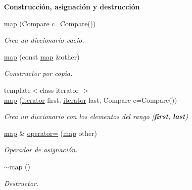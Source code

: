 \begin{Indent}\textbf{ Construcción, asignación y destrucción}\par
\begin{DoxyCompactItemize}
\item 
\hyperlink{classaed2_1_1iterator_ab55f7bc4639e905d66935b56995a5b1f_ab55f7bc4639e905d66935b56995a5b1f}{map} (Compare c=Compare())
\begin{DoxyCompactList}\small\item\em Crea un diccionario vacio. \end{DoxyCompactList}\item 
\hyperlink{classaed2_1_1iterator_aee42bcaf809b71168f4266e1d05971e2_aee42bcaf809b71168f4266e1d05971e2}{map} (const \hyperlink{classaed2_1_1map}{map} \&other)
\begin{DoxyCompactList}\small\item\em Constructor por copia. \end{DoxyCompactList}\item 
{\footnotesize template$<$class iterator $>$ }\\\hyperlink{classaed2_1_1iterator_aa44ca788a300603c5fae2d192e11f249_aa44ca788a300603c5fae2d192e11f249}{map} (\hyperlink{classaed2_1_1iterator_1_1iterator}{iterator} first, \hyperlink{classaed2_1_1iterator_1_1iterator}{iterator} last, Compare c=Compare())
\begin{DoxyCompactList}\small\item\em Crea un diccionario con los elementos del rango \mbox{[}{\bfseries first}, {\bfseries last}) \end{DoxyCompactList}\item 
\hyperlink{classaed2_1_1map}{map} \& \hyperlink{classaed2_1_1iterator_a7cafd02350b04f7546fa29c17168c18b_a7cafd02350b04f7546fa29c17168c18b}{operator=} (\hyperlink{classaed2_1_1map}{map} other)
\begin{DoxyCompactList}\small\item\em Operador de asignación. \end{DoxyCompactList}\item 
\hyperlink{classaed2_1_1iterator_a769d0ae1a1c7ed66acdd321e44fcd0e1_a769d0ae1a1c7ed66acdd321e44fcd0e1}{$\sim$map} ()
\begin{DoxyCompactList}\small\item\em Destructor. \end{DoxyCompactList}\end{DoxyCompactItemize}
\end{Indent}
